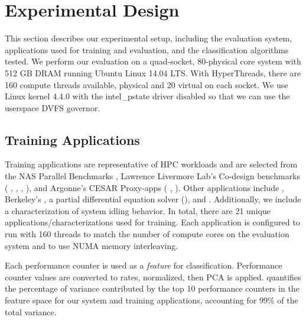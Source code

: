 \section{Experimental Design}
\label{sec:classifiers-usage}

This section describes our experimental setup, including the evaluation system, applications used for training and evaluation, and the classification algorithms tested.
We perform our evaluation on a quad-socket, 80-physical core system with 512 GB DRAM running Ubuntu Linux 14.04 LTS.
With HyperThreads, there are 160 compute threads available,  physical and 20 virtual on each socket.
We use Linux kernel 4.4.0 with the intel\_pstate driver disabled so that we can use the userspace DVFS governor.


\subsection{Training Applications}
\label{sec:setup-training}


Training applications are representative of HPC workloads and are selected from the NAS Parallel Benchmarks \cite{NPB}, Lawrence Livermore Lab's Co-design benchmarks ( \cite{BoomerAMG},  \cite{Kripke},  \cite{LULESH2},  \cite{Quicksilver}), and Argonne's CESAR Proxy-apps ( \cite{XSBench},  \cite{RSBench}).
Other applications include  \cite{CoMDGit}, Berkeley's  \cite{hpgmg}, a partial differential equation solver (), and  \cite{stream}.
Additionally, we include a characterization of system idling behavior.
In total, there are 21 unique applications/characterizations used for training.
Each application is configured to run with 160 threads to match the number of compute cores on the evaluation system and to use NUMA memory interleaving.

Each performance counter is used as a \emph{feature} for classification.
Performance counter values are converted to rates, normalized, then PCA is applied.
 quantifies the percentage of variance contributed by the top 10 performance counters in the feature space for our system and training applications, accounting for 99\% of the total variance.


